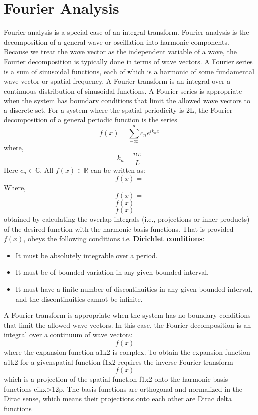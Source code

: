 \section{Fourier Analysis}
Fourier analysis is a special case of an integral transform. 
Fourier analysis is the decomposition of a general wave or oscillation into harmonic components.
Because we treat the wave vector as the independent variable of a wave, the Fourier decomposition
is typically done in terms of wave vectors. A Fourier series is a sum of sinusoidal functions, each of
which is a harmonic of some fundamental wave vector or spatial frequency. A Fourier transform is an
integral over a continuous distribution of sinusoidal functions.
A Fourier series is appropriate when the system has boundary conditions that limit the allowed
wave vectors to a discrete set. For a system where the spatial periodicity is 2L, the Fourier decomposition of a general periodic function is the series
\begin{equation}
f(x) = \sum_{-\infty}^{\infty} c_{n}e^{i k_{n}x}
\end{equation}
where,
$$k_{n} = \frac{n \pi}{L}$$
Here $c_{n} \in \mathbb{C}$. All $f(x) \in \mathbb{R}$ can be written as:
\begin{equation}
f(x) = 
\end{equation}
Where,
\begin{equation}
	f(x) = 
\end{equation}
\begin{equation}
	f(x) = 
\end{equation}
\begin{equation}
	f(x) = 
\end{equation}
obtained by calculating the overlap integrals (i.e., projections or inner products) of the desired function with the harmonic basis functions. That is provided $f(x)$, obeys the following conditions i.e. \textbf{Dirichlet conditions}:
\begin{itemize}
\item It must be absolutely integrable over a period.
\item It must be of bounded variation in any given bounded interval.
\item It must have a finite number of discontinuities in any given bounded interval, and the discontinuities cannot be infinite.
\end{itemize}
A Fourier transform is appropriate when the system has no boundary conditions that limit the allowed wave vectors. In this case, the Fourier decomposition is an integral over a continuum of wave vectors:
\begin{equation}
	f(x) = 
\end{equation}
where  the  expansion  function  a1k2  is  complex.  To  obtain  the  expansion  function  a1k2  for  a  givenspatial function f1x2 requires the inverse Fourier transform
\begin{equation}
	f(x) = 
\end{equation}
which is a projection of the spatial function f1x2 onto the harmonic basis functions eikx>12p. The basis functions are orthogonal and normalized in the Dirac sense, which means their projections onto each other are Dirac delta functions
